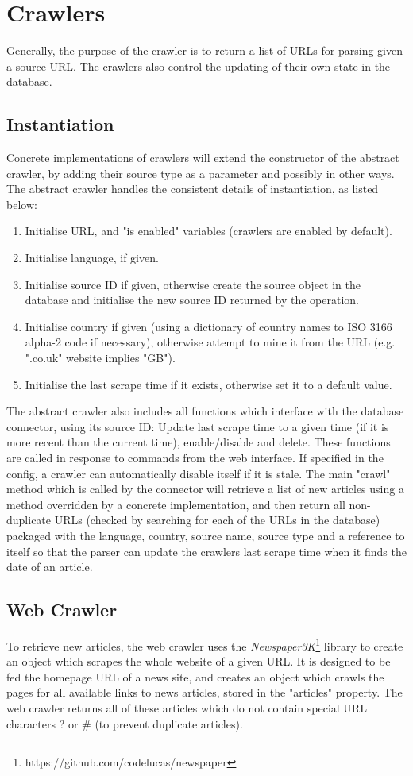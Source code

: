 \documentclass{l4proj}
\begin{document}
\section{Crawlers}
Generally, the purpose of the crawler is to return a list of URLs for parsing given a source URL. The crawlers also control the updating of their own state in the database.

\subsection{Instantiation}
Concrete implementations of crawlers will extend the constructor of the abstract crawler, by adding their source type as a parameter and possibly in other ways. The abstract crawler handles the consistent details of instantiation, as listed below:
\begin{enumerate}
    \item Initialise URL, and "is enabled" variables (crawlers are enabled by default).
    \item Initialise language, if given.
    \item Initialise source ID if given, otherwise create the source object in the database and initialise the new source ID returned by the operation.
    \item Initialise country if given (using a dictionary of country names to ISO 3166 alpha-2 code if necessary), otherwise attempt to mine it from the URL (e.g. ".co.uk" website implies "GB").
    \item Initialise the last scrape time if it exists, otherwise set it to a default value.
\end{enumerate}
The abstract crawler also includes all functions which interface with the database connector, using its source ID: Update last scrape time to a given time (if it is more recent than the current time), enable/disable and delete. These functions are called in response to commands from the web interface. If specified in the config, a crawler can automatically disable itself if it is stale. The main "crawl" method which is called by the connector will retrieve a list of new articles using a method overridden by a concrete implementation, and then return all non-duplicate URLs (checked by searching for each of the URLs in the database) packaged with the language, country, source name, source type and a reference to itself so that the parser can update the crawlers last scrape time when it finds the date of an article.

\subsection{Web Crawler}
To retrieve new articles, the web crawler uses the \emph{Newspaper3K}\footnote{https://github.com/codelucas/newspaper} library to create an object which scrapes the whole website of a given URL. It is designed to be fed the homepage URL of a news site, and creates an object which crawls the pages for all available links to news articles, stored in the "articles" property. The web crawler returns all of these articles which do not contain special URL characters ? or \# (to prevent duplicate articles).
\end{document}
